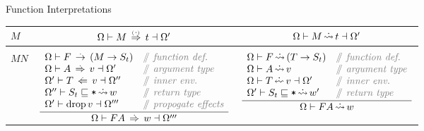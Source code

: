 \documentclass[12pt,twoside]{report}
\begin{document}
\begin{adjustwidth}{-0cm}{-0cm}
\begin{Definition}{Function Interpretations}{}
  \small
  \begin{tabular}{p{1.2cm}|cc}
    $M$ & $\Omega \vdash M \,\stackrel{_(._)}{\Rightarrow}\, t \dashv \Omega'$ & $\Omega \vdash M \,\dot{\rightsquigarrow}\, t \dashv \Omega'$ \\
    \hline

    \\$M N$ &
    $\dfrac{
      \begin{array}{ll}
        \Omega \vdash F \readarrowabs (M \rightarrow S_t) & \ocomment{function def.} \\
        \Omega \vdash A \movearrowabs v \dashv \Omega' & \ocomment{argument type} \\
        \Omega' \vdash T \writearrowabs v \dashv \Omega'' & \ocomment{inner env.} \\
        \Omega'' \vdash S_t \subtype \mono{*} \erasedreadarrow w & \ocomment{return type} \\
        \Omega' \vdash \text{drop}\,v \dashv \Omega''' & \ocomment{propogate effects} \\
      \end{array}
    }{
      \Omega \vdash F A \movearrowabs w \dashv \Omega'''
    }$ &
    $\dfrac{
      \begin{array}{ll}
        \Omega \vdash F \erasedreadarrow (T \rightarrow S_t) & \ocomment{function def.} \\
        \Omega \vdash A \erasedreadarrow v & \ocomment{argument type} \\
        \Omega \vdash T \erasedwritearrow v \dashv \Omega' & \ocomment{inner env.} \\
        \Omega' \vdash S_t \subtype \mono{*} \erasedreadarrow w' & \ocomment{return type}
      \end{array}
    }{
      \Omega \vdash F A \erasedreadarrow w
    }$ \\


\end{tabular}
\end{Definition}
\end{adjustwidth}
\end{document}
